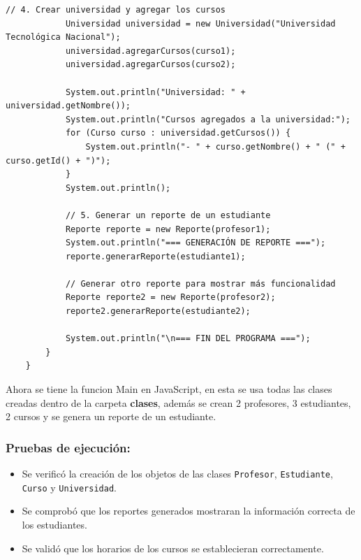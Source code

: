 \begin{lstlisting}[style=java-custom, caption={Función Main en Java}]
            // 4. Crear universidad y agregar los cursos
            Universidad universidad = new Universidad("Universidad Tecnológica Nacional");
            universidad.agregarCursos(curso1);
            universidad.agregarCursos(curso2);
            
            System.out.println("Universidad: " + universidad.getNombre());
            System.out.println("Cursos agregados a la universidad:");
            for (Curso curso : universidad.getCursos()) {
                System.out.println("- " + curso.getNombre() + " (" + curso.getId() + ")");
            }
            System.out.println();
            
            // 5. Generar un reporte de un estudiante
            Reporte reporte = new Reporte(profesor1);
            System.out.println("=== GENERACIÓN DE REPORTE ===");
            reporte.generarReporte(estudiante1);
            
            // Generar otro reporte para mostrar más funcionalidad
            Reporte reporte2 = new Reporte(profesor2);
            reporte2.generarReporte(estudiante2);
            
            System.out.println("\n=== FIN DEL PROGRAMA ===");
        }
    }
\end{lstlisting}

Ahora se tiene la funcion Main en JavaScript, en esta se usa todas las clases creadas dentro de la carpeta \textbf{clases}, además se crean 2 profesores, 3 estudiantes, 2 cursos y se genera un reporte de un estudiante.




\subsubsection{Pruebas de ejecución:}

\begin{itemize}
    \item Se verificó la creación de los objetos de las clases \texttt{Profesor}, \texttt{Estudiante}, \texttt{Curso} y \texttt{Universidad}.
    \item Se comprobó que los reportes generados mostraran la información correcta de los estudiantes.
    \item Se validó que los horarios de los cursos se establecieran correctamente.
\end{itemize}

